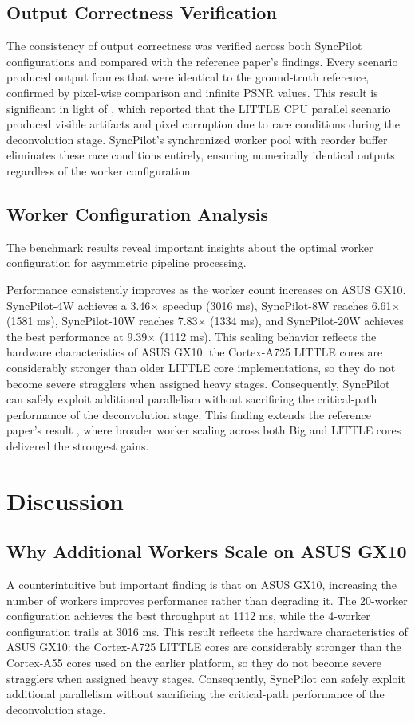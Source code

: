 \documentclass[runningheads]{llncs}
\begin{document}
\subsection{Output Correctness Verification}
The consistency of output correctness was verified across both SyncPilot configurations and compared with the reference paper's findings. Every scenario produced output frames that were identical to the ground-truth reference, confirmed by pixel-wise comparison and infinite PSNR values. This result is significant in light of \cite{annisa2025fsrcnn}, which reported that the LITTLE CPU parallel scenario produced visible artifacts and pixel corruption due to race conditions during the deconvolution stage. SyncPilot's synchronized worker pool with reorder buffer eliminates these race conditions entirely, ensuring numerically identical outputs regardless of the worker configuration.

\subsection{Worker Configuration Analysis}
The benchmark results reveal important insights about the optimal worker configuration for asymmetric pipeline processing.

Performance consistently improves as the worker count increases on ASUS GX10. SyncPilot-4W achieves a 3.46$\times$ speedup (3016 ms), SyncPilot-8W reaches 6.61$\times$ (1581 ms), SyncPilot-10W reaches 7.83$\times$ (1334 ms), and SyncPilot-20W achieves the best performance at 9.39$\times$ (1112 ms). This scaling behavior reflects the hardware characteristics of ASUS GX10: the Cortex-A725 LITTLE cores are considerably stronger than older LITTLE core implementations, so they do not become severe stragglers when assigned heavy stages. Consequently, SyncPilot can safely exploit additional parallelism without sacrificing the critical-path performance of the deconvolution stage. This finding extends the reference paper's result \cite{annisa2025fsrcnn}, where broader worker scaling across both Big and LITTLE cores delivered the strongest gains.

\section{Discussion}

\subsection{Why Additional Workers Scale on ASUS GX10}
A counterintuitive but important finding is that on ASUS GX10, increasing the number of workers improves performance rather than degrading it. The 20-worker configuration achieves the best throughput at 1112 ms, while the 4-worker configuration trails at 3016 ms. This result reflects the hardware characteristics of ASUS GX10: the Cortex-A725 LITTLE cores are considerably stronger than the Cortex-A55 cores used on the earlier platform, so they do not become severe stragglers when assigned heavy stages. Consequently, SyncPilot can safely exploit additional parallelism without sacrificing the critical-path performance of the deconvolution stage.
\end{document}
